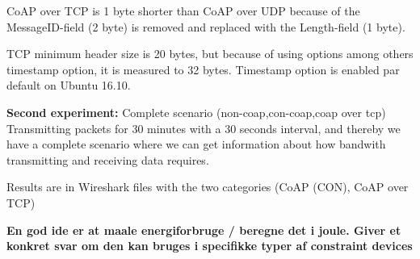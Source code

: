 CoAP over TCP is 1 byte shorter than CoAP over UDP because of the MessageID-field (2 byte) is removed and replaced with the Length-field (1 byte).

TCP minimum header size is 20 bytes, but because of using options among others timestamp option, it is measured to 32 bytes. Timestamp option is enabled par default on Ubuntu 16.10.

\textbf{Second experiment:} Complete scenario (non-coap,con-coap,coap over tcp)
Transmitting packets for 30 minutes with a 30 seconds interval, and thereby we have a complete scenario where we can get information about how bandwith transmitting and receiving data requires.

Results are in Wireshark files with the two categories (CoAP (CON), CoAP over TCP)

\textbf{En god ide er at maale energiforbruge / beregne det i joule. Giver et konkret svar om den kan bruges i specifikke typer af constraint devices}



